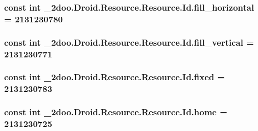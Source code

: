 \hypertarget{class__2doo_1_1_droid_1_1_resource_1_1_id_f26fdf4881b6a1e76833e9dc848a33d6}{
\subsubsection[{fill\_\-horizontal}]{\setlength{\rightskip}{0pt plus 5cm}const int \_\-2doo.Droid.Resource.Resource.Id.fill\_\-horizontal = 2131230780}}
\label{class__2doo_1_1_droid_1_1_resource_1_1_id_f26fdf4881b6a1e76833e9dc848a33d6}


\hypertarget{class__2doo_1_1_droid_1_1_resource_1_1_id_74b4c33dc78816d59c5291ae5ca750f4}{
\subsubsection[{fill\_\-vertical}]{\setlength{\rightskip}{0pt plus 5cm}const int \_\-2doo.Droid.Resource.Resource.Id.fill\_\-vertical = 2131230771}}
\label{class__2doo_1_1_droid_1_1_resource_1_1_id_74b4c33dc78816d59c5291ae5ca750f4}


\hypertarget{class__2doo_1_1_droid_1_1_resource_1_1_id_e0133de08db320a62abc634271398b22}{
\subsubsection[{fixed}]{\setlength{\rightskip}{0pt plus 5cm}const int \_\-2doo.Droid.Resource.Resource.Id.fixed = 2131230783}}
\label{class__2doo_1_1_droid_1_1_resource_1_1_id_e0133de08db320a62abc634271398b22}


\hypertarget{class__2doo_1_1_droid_1_1_resource_1_1_id_34d6ce5d979371e564f3a8c74f7b5336}{
\subsubsection[{home}]{\setlength{\rightskip}{0pt plus 5cm}const int \_\-2doo.Droid.Resource.Resource.Id.home = 2131230725}}
\label{class__2doo_1_1_droid_1_1_resource_1_1_id_34d6ce5d979371e564f3a8c74f7b5336}


